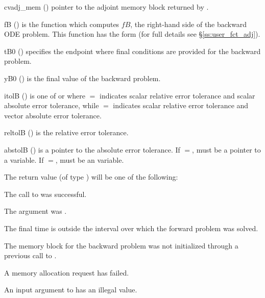 {
  \begin{args}
  \item[cvadj\_mem] ()
    pointer to the adjoint memory block returned by .
  \item[fB] ()
    is the {\C} function which computes $fB$, the right-hand side of the 
    backward ODE problem. This function has the form 
     (for full details see \S\ref{ss:user_fct_adj}).
  \item[tB0] ()
    specifies the endpoint where final conditions are provided for the 
    backward problem.
  \item[yB0] ()
    is the final value of the backward problem. 
  \item[itolB] () 
    is one of  or   where $=$ indicates scalar relative error 
    tolerance and scalar absolute error tolerance, while $=$ indicates scalar
    relative error tolerance and vector absolute error tolerance. 
  \item[reltolB] ()
    is the relative error tolerance.
  \item[abstolB] ()
    is a pointer to the absolute error tolerance. If $=$, 
    must be a pointer to a  variable. If $=$, 
    must be an  variable.
  \end{args}
}
{
  The return value  (of type ) will be one of the following:
  \begin{args}
  \item[\Id{CV\_SUCCESS}]
    The call to  was successful.
  \item[\Id{CV\_ADJMEM\_NULL}]
    The  argument was .
  \item[\Id{CV\_BAD\_TB0}]
    The final time  is outside the interval over which the forward problem
    was solved.
  \item[\Id{CV\_MEM\_NULL}] 
    The {\cvodes} memory block for the backward problem was not initialized through 
    a previous call to .
  \item[\Id{CV\_MEM\_FAIL}] 
    A memory allocation request has failed.
  \item[\Id{CV\_ILL\_INPUT}] 
    An input argument to  has an illegal value.
  \end{args}
}
